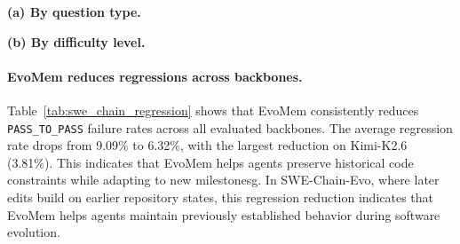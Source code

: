 \documentclass{llmxive}
\begin{document}
\begin{table}[htbp]
\centering
\begin{minipage}[t]{0.53\linewidth}
\centering
{}
\textbf{(a) By question type.}
\end{minipage}
\hspace{0.035\linewidth}
\begin{minipage}[t]{0.41\linewidth}
\centering
{}
\textbf{(b) By difficulty level.}
\end{minipage}

\caption{
\textbf{\small \textsc{PersonaMem-Evo} accuracy breakdown (\%).}
Results are grouped by reasoning type and difficulty level.
}
\label{tab:personamem_breakdown}
\end{table}


\paragraph{EvoMem reduces regressions across backbones.}
Table~\ref{tab:swe_chain_regression} shows that EvoMem consistently reduces \texttt{PASS\_TO\_PASS} failure rates across all evaluated backbones. The average regression rate drops from 9.09\% to 6.32\%, with the largest reduction on Kimi-K2.6 (3.81\%). This indicates that EvoMem helps agents preserve historical code constraints while adapting to new milestonesg. In SWE-Chain-Evo, where later edits build on earlier repository states, this regression reduction indicates that EvoMem helps agents maintain previously established behavior during software evolution.
\end{document}
